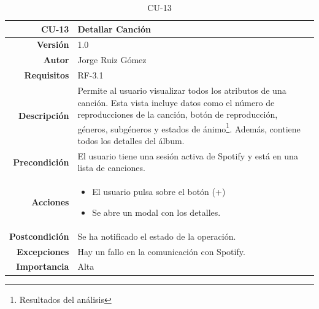 \begin{table}[H]
    \centering
    \begin{tabular}{r|p{}}
    \hline
    \textbf{CU-13}  & \textbf{Detallar Canción}                                 \\ \hline
    \textbf{Versión}       & 1.0                                                     \\
    \textbf{Autor}         & Jorge Ruiz Gómez                                        \\
    \textbf{Requisitos}    & RF-3.1                                         \\
    \textbf{Descripción}   & Permite al usuario visualizar todos los atributos de una canción. Esta vista incluye datos 
    como el número de reproducciones de la canción, botón de reproducción, géneros, subgéneros y estados de ánimo\footnote{Resultados del análisis}. Además, contiene todos los detalles del álbum.
    \\ \hline
    \textbf{Precondición}  & El usuario tiene una sesión activa de Spotify y está en una lista de canciones.\\
    \textbf{Acciones}      &    \begin{itemize}
                                    \item El usuario pulsa sobre el botón (+)
                                    \item Se abre un modal con los detalles.
                                \end{itemize}\\
                                                                              
    \textbf{Postcondición} & Se ha notificado el estado de la operación. \\
    \textbf{Excepciones}   & Hay un fallo en la comunicación con Spotify.                                                 \\
    \textbf{Importancia}   & Alta                                                   \\ \hline
    \end{tabular}
    \caption{CU-13}
    \label{tab:CUT-13}
\end{table}


